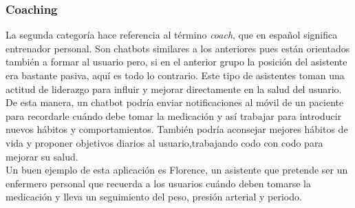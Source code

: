 \subsubsection{Coaching}
La segunda categoría hace referencia al término \textit{coach}, que en español significa entrenador personal. Son chatbots similares a los anteriores pues están orientados también a formar al usuario pero, si en el anterior grupo la posición del asistente era bastante pasiva, aquí es todo lo contrario. Este tipo de asistentes toman una actitud de liderazgo para influir y mejorar directamente en la salud del usuario.\\

De esta manera, un chatbot podría enviar notificaciones al móvil de un paciente para recordarle cuándo debe tomar la medicación y así trabajar para introducir nuevos hábitos y comportamientos. También podría aconsejar mejores hábitos de vida y proponer objetivos diarios al usuario,trabajando codo con codo para mejorar su salud.\\

Un buen ejemplo de esta aplicación es Florence, un asistente que pretende ser un enfermero personal que recuerda a los usuarios cuándo deben tomarse la medicación y lleva un seguimiento del peso, presión arterial y periodo.\\

